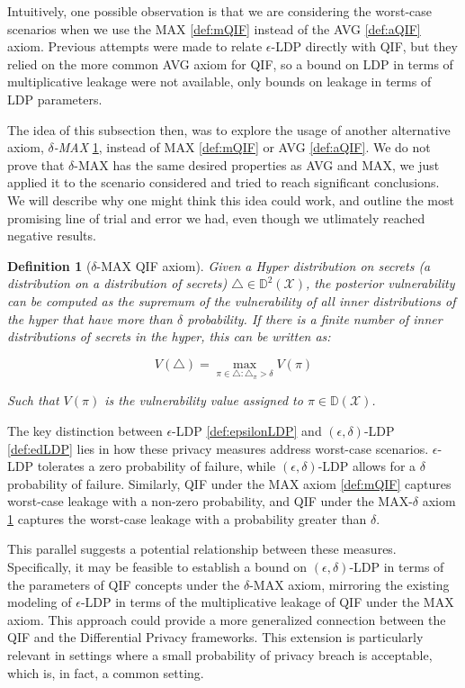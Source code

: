\documentclass[conference]{IEEEtran}
\newtheorem{definition}{Definition}
\newcommand{\DX}{\mathbb{D}(\mathcal{X})}
\newcommand{\DDX}{\mathbb{D}^2(\mathcal{X})}
\begin{document}
Intuitively, one possible observation is that we are considering the worst-case scenarios when we use the MAX \ref{def:mQIF} instead of the AVG \ref{def:aQIF} axiom. Previous attempts were made to relate $\epsilon$-LDP directly with QIF, but they relied on the more common AVG axiom for QIF\cite{alvim2015information}, so a bound on LDP in terms of multiplicative leakage were not available, only bounds on leakage in terms of LDP parameters.

The idea of this subsection then, was to explore the usage of another alternative axiom, \emph{$\delta$-MAX} \ref{def:dmQIF}, instead of MAX \ref{def:mQIF} or AVG \ref{def:aQIF}. We do not prove that $\delta$-MAX has the same desired properties as AVG and MAX, we just applied it to the scenario considered and tried to reach significant conclusions. We will describe why one might think this idea could work, and outline the most promising line of trial and error we had, even though we utlimately reached negative results.


\begin{definition}[$\delta$-MAX QIF axiom]\label{def:dmQIF}Given a Hyper distribution on secrets (a distribution on a distribution of secrets) $\triangle \in \DDX$, the posterior vulnerability can be computed as the supremum of the vulnerability of all inner distributions of the hyper that have more than $\delta$ probability. If there is a finite number of inner distributions of secrets in the hyper, this can be written as:

$$V(\triangle) = \max\limits_{\pi \in \triangle:\triangle_\pi > \delta}V(\pi)$$

Such that $V(\pi)$ is the vulnerability value assigned to $\pi \in \DX$.
\end{definition}

The key distinction between $\epsilon$-LDP \ref{def:epsilonLDP} and $(\epsilon, \delta)$-LDP \ref{def:edLDP} lies in how these privacy measures address worst-case scenarios. $\epsilon$-LDP tolerates a zero probability of failure, while $(\epsilon, \delta)$-LDP allows for a $\delta$ probability of failure. Similarly, QIF under the MAX axiom \ref{def:mQIF} captures worst-case leakage with a non-zero probability, and QIF under the MAX-$\delta$ axiom \ref{def:dmQIF} captures the worst-case leakage with a probability greater than $\delta$.

This parallel suggests a potential relationship between these measures. Specifically, it may be feasible to establish a bound on $(\epsilon, \delta)$-LDP in terms of the parameters of QIF concepts under the $\delta$-MAX axiom, mirroring the existing modeling of $\epsilon$-LDP in terms of the multiplicative leakage of QIF under the MAX axiom. This approach could provide a more generalized connection between the QIF and the Differential Privacy frameworks. This extension is particularly relevant in settings where a small probability of privacy breach is acceptable, which is, in fact, a common setting.
\end{document}
